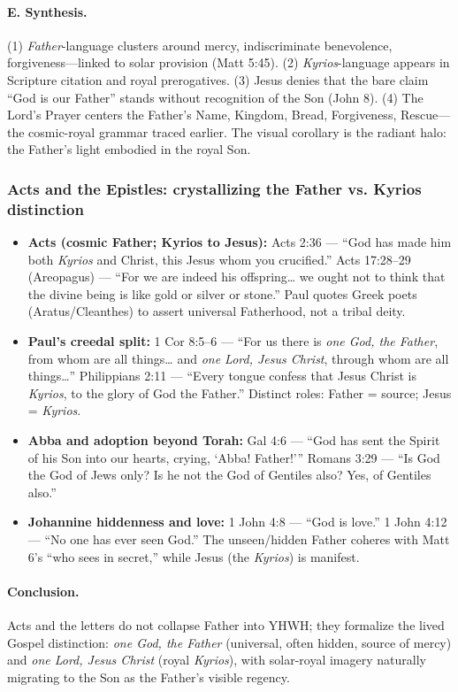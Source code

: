 \paragraph{E. Synthesis.}
(1) \emph{Father}-language clusters around mercy, indiscriminate benevolence, forgiveness—linked to solar provision (Matt 5:45). (2) \emph{Kyrios}-language appears in Scripture citation and royal prerogatives. (3) Jesus denies that the bare claim “God is our Father” stands without recognition of the Son (John 8). (4) The Lord’s Prayer centers the Father’s Name, Kingdom, Bread, Forgiveness, Rescue—the cosmic-royal grammar traced earlier. The visual corollary is the radiant halo: the Father’s light embodied in the royal Son.

\subsubsection{Acts and the Epistles: crystallizing the Father vs. Kyrios distinction}\label{subsubsec:acts-epistles-father-kyrios}
\begin{itemize}
  \item \textbf{Acts (cosmic Father; Kyrios to Jesus):} Acts 2:36 — “God has made him both \emph{Kyrios} and Christ, this Jesus whom you crucified.” Acts 17:28–29 (Areopagus) — “For we are indeed his offspring… we ought not to think that the divine being is like gold or silver or stone.” Paul quotes Greek poets (Aratus/Cleanthes) to assert universal Fatherhood, not a tribal deity.
  \item \textbf{Paul’s creedal split:} 1 Cor 8:5–6 — “For us there is \emph{one God, the Father}, from whom are all things… and \emph{one Lord, Jesus Christ}, through whom are all things…” Philippians 2:11 — “Every tongue confess that Jesus Christ is \emph{Kyrios}, to the glory of God the Father.” Distinct roles: Father = source; Jesus = \emph{Kyrios}.
  \item \textbf{Abba and adoption beyond Torah:} Gal 4:6 — “God has sent the Spirit of his Son into our hearts, crying, ‘Abba! Father!’” Romans 3:29 — “Is God the God of Jews only? Is he not the God of Gentiles also? Yes, of Gentiles also.”
  \item \textbf{Johannine hiddenness and love:} 1 John 4:8 — “God is love.” 1 John 4:12 — “No one has ever seen God.” The unseen/hidden Father coheres with Matt 6’s “who sees in secret,” while Jesus (the \emph{Kyrios}) is manifest.
\end{itemize}
\paragraph{Conclusion.} Acts and the letters do not collapse Father into YHWH; they formalize the lived Gospel distinction: \emph{one God, the Father} (universal, often hidden, source of mercy) and \emph{one Lord, Jesus Christ} (royal \emph{Kyrios}), with solar-royal imagery naturally migrating to the Son as the Father’s visible regency.
